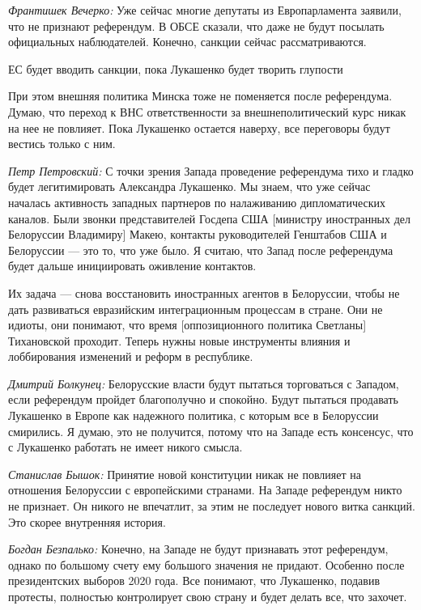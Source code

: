 \textit{Франтишек Вечерко:} Уже сейчас многие депутаты из Европарламента заявили, что не признают референдум. В ОБСЕ сказали, что даже не будут посылать официальных наблюдателей. Конечно, санкции сейчас рассматриваются.

\begin{fancyquotes}
    ЕС будет вводить санкции, пока Лукашенко будет творить глупости
\end{fancyquotes}

При этом внешняя политика Минска тоже не поменяется после референдума. Думаю, что переход к ВНС ответственности за внешнеполитический курс никак на нее не повлияет. Пока Лукашенко остается наверху, все переговоры будут вестись только с ним.

\textit{Петр Петровский:} С точки зрения Запада проведение референдума тихо и гладко будет легитимировать Александра Лукашенко. Мы знаем, что уже сейчас началась активность западных партнеров по налаживанию дипломатических каналов. Были звонки представителей Госдепа США [министру иностранных дел Белоруссии Владимиру] Макею, контакты руководителей Генштабов США и Белоруссии — это то, что уже было. Я считаю, что Запад после референдума будет дальше инициировать оживление контактов.

Их задача — снова восстановить иностранных агентов в Белоруссии, чтобы не дать развиваться евразийским интеграционным процессам в стране. Они не идиоты, они понимают, что время [оппозиционного политика Светланы] Тихановской проходит. Теперь нужны новые инструменты влияния и лоббирования изменений и реформ в республике.

\textit{Дмитрий Болкунец:} Белорусские власти будут пытаться торговаться с Западом, если референдум пройдет благополучно и спокойно. Будут пытаться продавать Лукашенко в Европе как надежного политика, с которым все в Белоруссии смирились. Я думаю, это не получится, потому что на Западе есть консенсус, что с Лукашенко работать не имеет никого смысла.

\textit{Станислав Бышок:} Принятие новой конституции никак не повлияет на отношения Белоруссии с европейскими странами. На Западе референдум никто не признает. Он никого не впечатлит, за этим не последует нового витка санкций. Это скорее внутренняя история.

\textit{Богдан Безпалько:} Конечно, на Западе не будут признавать этот референдум, однако по большому счету ему большого значения не придают. Особенно после президентских выборов 2020 года. Все понимают, что Лукашенко, подавив протесты, полностью контролирует свою страну и будет делать все, что захочет.

